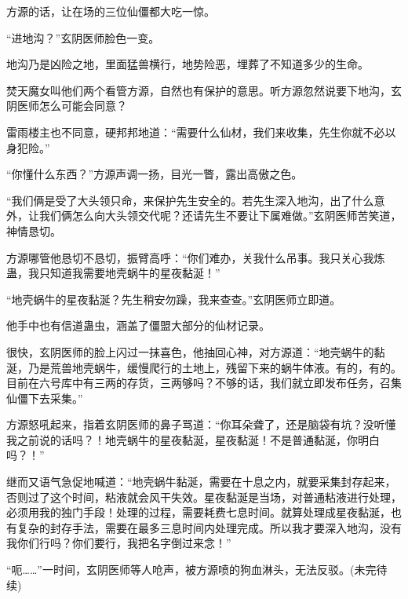\begin{this_body}
方源的话，让在场的三位仙僵都大吃一惊。

“进地沟？”玄阴医师脸色一变。

地沟乃是凶险之地，里面猛兽横行，地势险恶，埋葬了不知道多少的生命。

焚天魔女叫他们两个看管方源，自然也有保护的意思。听方源忽然说要下地沟，玄阴医师怎么可能会同意？

雷雨楼主也不同意，硬邦邦地道：“需要什么仙材，我们来收集，先生你就不必以身犯险。”

“你懂什么东西？”方源声调一扬，目光一瞥，露出高傲之色。

“我们俩是受了大头领只命，来保护先生安全的。若先生深入地沟，出了什么意外，让我们俩怎么向大头领交代呢？还请先生不要让下属难做。”玄阴医师苦笑道，神情恳切。

方源哪管他恳切不恳切，振臂高呼：“你们难办，关我什么吊事。我只关心我炼蛊，我只知道我需要地壳蜗牛的星夜黏涎！”

“地壳蜗牛的星夜黏涎？先生稍安勿躁，我来查查。”玄阴医师立即道。

他手中也有信道蛊虫，涵盖了僵盟大部分的仙材记录。

很快，玄阴医师的脸上闪过一抹喜色，他抽回心神，对方源道：“地壳蜗牛的黏涎，乃是荒兽地壳蜗牛，缓慢爬行的土地上，残留下来的蜗牛体液。有的，有的。目前在六号库中有三两的存货，三两够吗？不够的话，我们就立即发布任务，召集仙僵下去采集。”

方源怒吼起来，指着玄阴医师的鼻子骂道：“你耳朵聋了，还是脑袋有坑？没听懂我之前说的话吗？！地壳蜗牛的星夜黏涎，星夜黏涎！不是普通黏涎，你明白吗？！”

继而又语气急促地喊道：“地壳蜗牛黏涎，需要在十息之内，就要采集封存起来，否则过了这个时间，粘液就会风干失效。星夜黏涎是当场，对普通粘液进行处理，必须用我的独门手段！处理的过程，需要耗费七息时间。就算处理成星夜黏涎，也有复杂的封存手法，需要在最多三息时间内处理完成。所以我才要深入地沟，没有我你们行吗？你们要行，我把名字倒过来念！”

“呃……”一时间，玄阴医师等人呛声，被方源喷的狗血淋头，无法反驳。(未完待续)

\end{this_body}


